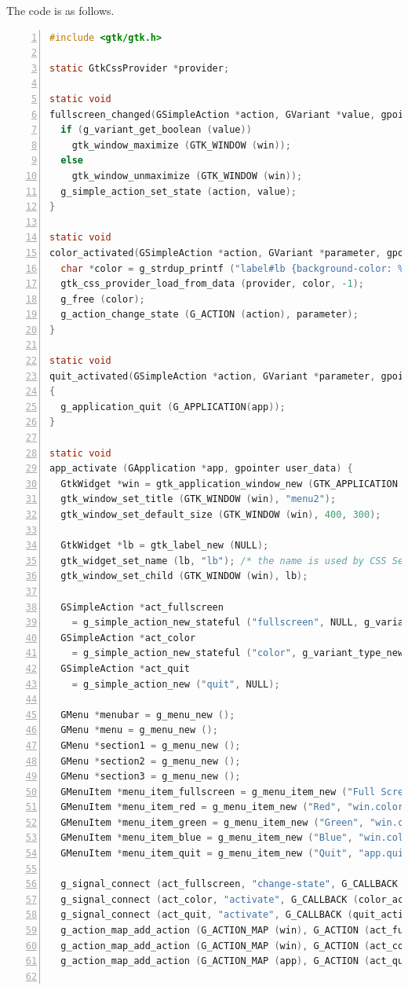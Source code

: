 The code is as follows.

\begin{lstlisting}[language=C, numbers=left]
#include <gtk/gtk.h>

static GtkCssProvider *provider;

static void
fullscreen_changed(GSimpleAction *action, GVariant *value, gpointer win) {
  if (g_variant_get_boolean (value))
    gtk_window_maximize (GTK_WINDOW (win));
  else
    gtk_window_unmaximize (GTK_WINDOW (win));
  g_simple_action_set_state (action, value);
}

static void
color_activated(GSimpleAction *action, GVariant *parameter, gpointer win) {
  char *color = g_strdup_printf ("label#lb {background-color: %s;}", g_variant_get_string (parameter, NULL));
  gtk_css_provider_load_from_data (provider, color, -1);
  g_free (color);
  g_action_change_state (G_ACTION (action), parameter);
}

static void
quit_activated(GSimpleAction *action, GVariant *parameter, gpointer app)
{
  g_application_quit (G_APPLICATION(app));
}

static void
app_activate (GApplication *app, gpointer user_data) {
  GtkWidget *win = gtk_application_window_new (GTK_APPLICATION (app));
  gtk_window_set_title (GTK_WINDOW (win), "menu2");
  gtk_window_set_default_size (GTK_WINDOW (win), 400, 300);

  GtkWidget *lb = gtk_label_new (NULL);
  gtk_widget_set_name (lb, "lb"); /* the name is used by CSS Selector */
  gtk_window_set_child (GTK_WINDOW (win), lb);

  GSimpleAction *act_fullscreen
    = g_simple_action_new_stateful ("fullscreen", NULL, g_variant_new_boolean (FALSE));
  GSimpleAction *act_color
    = g_simple_action_new_stateful ("color", g_variant_type_new("s"), g_variant_new_string ("red"));
  GSimpleAction *act_quit
    = g_simple_action_new ("quit", NULL);

  GMenu *menubar = g_menu_new ();
  GMenu *menu = g_menu_new ();
  GMenu *section1 = g_menu_new ();
  GMenu *section2 = g_menu_new ();
  GMenu *section3 = g_menu_new ();
  GMenuItem *menu_item_fullscreen = g_menu_item_new ("Full Screen", "win.fullscreen");
  GMenuItem *menu_item_red = g_menu_item_new ("Red", "win.color::red");
  GMenuItem *menu_item_green = g_menu_item_new ("Green", "win.color::green");
  GMenuItem *menu_item_blue = g_menu_item_new ("Blue", "win.color::blue");
  GMenuItem *menu_item_quit = g_menu_item_new ("Quit", "app.quit");

  g_signal_connect (act_fullscreen, "change-state", G_CALLBACK (fullscreen_changed), win);
  g_signal_connect (act_color, "activate", G_CALLBACK (color_activated), win);
  g_signal_connect (act_quit, "activate", G_CALLBACK (quit_activated), app);
  g_action_map_add_action (G_ACTION_MAP (win), G_ACTION (act_fullscreen));
  g_action_map_add_action (G_ACTION_MAP (win), G_ACTION (act_color));
  g_action_map_add_action (G_ACTION_MAP (app), G_ACTION (act_quit));


\end{lstlisting}
